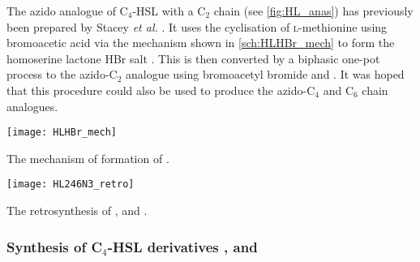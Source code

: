 The azido analogue of C$_4$-HSL with a C$_2$ chain  (see \ref{fig:HL_anas}) has previously been prepared by Stacey \textit{et al.} \cite{Stacy2013}. It uses the cyclisation of \textsc{l}-methionine  using bromoacetic acid via the mechanism shown in \ref{sch:HLHBr_mech} to form the homoserine lactone HBr salt . This is then converted by a biphasic one-pot process to the azido-C$_2$ analogue  using bromoacetyl bromide  and . It was hoped that this procedure could also be used to produce the azido-C$_4$ and C$_6$ chain analogues.

\begin{scheme}[H]
	\begin{center}
		\texttt{[image: HLHBr\_mech]}
		\caption{The mechanism of formation of . \label{sch:HLHBr_mech}}
	\end{center}
\end{scheme}

\begin{scheme}[H]
	\begin{center}
		\texttt{[image: HL246N3\_retro]}
		\caption{The retrosynthesis of ,  and . \label{sch:HL246N3_retro}}
	\end{center}
\end{scheme}


\subsubsection{Synthesis of C$_4$-HSL derivatives ,  and \label{sec:HL4N3}}

